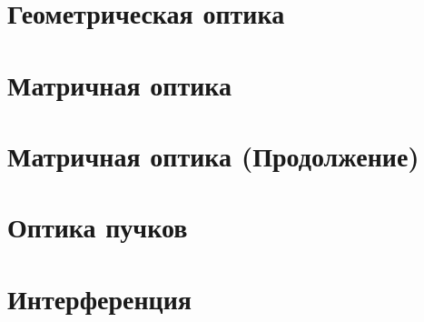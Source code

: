 


\section{Геометрическая оптика}

\newpage 

\section{Матричная оптика}


\section{Матричная оптика (Продолжение)}


\section{Оптика пучков}


\section{Интерференция}



